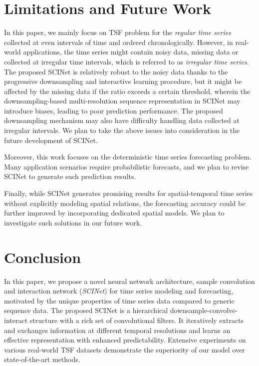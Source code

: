 \documentclass{article}
\begin{document}
\section{Limitations and Future Work}
\label{sec:limation_fw}
In this paper, we mainly focus on TSF problem for the \textit{regular time series} collected at even intervals of time and ordered chronologically. However, in real-world applications, the time series might contain noisy data, missing data or collected at irregular time intervals, which is referred to as \textit{irregular time series}. The proposed SCINet is relatively robust to the noisy data thanks to the progressive downsampling and interactive learning procedure, but it might be affected by the missing data if the ratio exceeds a certain threshold, wherein the downsampling-based multi-resolution sequence representation in SCINet may introduce biases, leading to poor prediction performance. The proposed downsampling mechanism may also have difficulty handling data collected at irregular intervals. We plan to take the above issues into consideration in the future development of SCINet. 

Moreover, this work focuses on the deterministic time series forecasting problem. Many application scenarios require probabilistic forecasts, and we plan to revise SCINet to generate such prediction results. 

Finally, while SCINet generates promising results for spatial-temporal time series without explicitly modeling spatial relations, the forecasting accuracy could be further improved by incorporating dedicated spatial models. We plan to investigate such solutions in our future work.  




\section{Conclusion}
In this paper, we propose a novel neural network architecture, sample convolution and interaction network (\textit{SCINet}) for time series modeling and forecasting, motivated by the unique properties of time series data compared to generic sequence data. The proposed SCINet is a hierarchical downsample-convolve-interact structure with a rich set of convolutional filters. It iteratively extracts and exchanges information at different temporal resolutions and learns an effective representation with enhanced predictability. Extensive experiments on various real-world TSF datasets demonstrate the superiority of our model over state-of-the-art methods.
\end{document}
